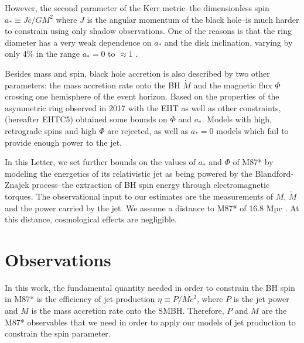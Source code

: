 \documentclass[twocolumn]{aastex62} %
\begin{document}
However, the second parameter of the Kerr metric--the dimensionless spin $a_* \equiv Jc/GM^2$ where $J$ is the angular momentum of the black hole--is much harder to constrain using only shadow observations. One of the reasons is that the ring diameter has a very weak dependence on $a_*$ and the disk inclination, varying by only 4\% in the range $a_*=0$ to $\approx 1$ \citep{Takahashi2004,Johannsen2010}. 

Besides mass and spin, black hole accretion is also described by two other parameters: the mass accretion rate onto the BH $\dot{M}$ and the magnetic flux $\Phi$ crossing one hemisphere of the event horizon. 
Based on the properties of the asymmetric ring observed in 2017 with the EHT as well as other constraints, \cite{EHTC2019d} (hereafter EHTC5) obtained some bounds on $\Phi$ and $a_*$. Models with high, retrograde spins and high $\Phi$ are rejected, as well as $a_*=0$ models which fail to provide enough power to the jet. 

In this Letter, we set further bounds on the values of $a_*$ and $\Phi$ of M87* by modeling the energetics of its relativistic jet as being powered by the Blandford-Znajek process--the extraction of BH spin energy through electromagnetic torques. The observational input to our estimates are the measurements of $M$, $\dot{M}$ and the power carried by the jet. We assume a distance to M87* of 16.8 Mpc . At this distance, cosmological effects are negligible. 




\section{Observations} \label{sec:obs}

In this work, the fundamental quantity needed in order to constrain the BH spin in M87* is the efficiency of jet production $\eta \equiv P/ \dot{M} c^2$, where $P$ is the jet power and $\dot{M}$ is the mass accretion rate onto the SMBH. Therefore, $P$ and $\dot{M}$ are the M87* observables that we need in order to apply our models of jet production to constrain the spin parameter.
\end{document}
